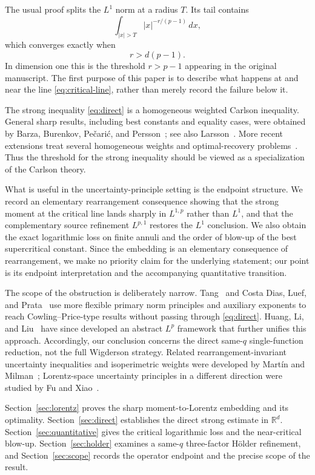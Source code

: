 \documentclass[11pt]{amsart}
\theoremstyle{remark}
\newcommand{\R}{\mathbb R}
\begin{document}
The usual proof splits the $L^1$ norm at a radius $T$.  Its tail contains
\[
 \int_{|x|>T}|x|^{-r/(p-1)}\,dx,
\]
which converges exactly when
\begin{equation}\label{eq:critical-line}
 r>d(p-1).
\end{equation}
In dimension one this is the threshold $r>p-1$ appearing in the original
manuscript.  The first purpose of this paper is to describe what happens at
and near the line \eqref{eq:critical-line}, rather than merely record the
failure below it.

The strong inequality \eqref{eq:direct} is a homogeneous weighted Carlson
inequality.  General sharp results, including best constants and equality
cases, were obtained by Barza, Burenkov, Pe\v{c}ari\'{c}, and
Persson~\cite{BBPP98}; see also Larsson~\cite{Larsson03}.  More recent
extensions treat several homogeneous weights and optimal-recovery
problems~\cite{Osipenko24}.  Thus the threshold for the strong inequality
should be viewed as a specialization of the Carlson theory.

What is useful in the uncertainty-principle setting is the endpoint
structure.  We record an elementary rearrangement consequence showing that
the strong moment at the critical line lands sharply in $L^{1,p}$ rather
than $L^1$, and that the complementary source refinement $L^{p,1}$ restores
the $L^1$ conclusion.  We also obtain the exact logarithmic loss on finite
annuli and the order of blow-up of the best supercritical constant.  Since the embedding is an elementary consequence of rearrangement, we
make no priority claim for the underlying statement; our point is its
endpoint interpretation and the accompanying quantitative transition.

The scope of the obstruction is deliberately narrow.  Tang~\cite{Tang25}
and Costa Dias, Luef, and Prata~\cite{DLP25} use more flexible primary norm
principles and auxiliary exponents to reach Cowling--Price-type results
without passing through \eqref{eq:direct}.  Huang, Li, and Liu~\cite{HLL}
have since developed an abstract $L^p$ framework that further unifies this
approach.  Accordingly, our conclusion concerns the direct same-$q$
single-function reduction, not the full Wigderson strategy.  Related
rearrangement-invariant uncertainty inequalities and isoperimetric weights
were developed by Mart\'in and Milman~\cite{MartinMilman16}; Lorentz-space
uncertainty principles in a different direction were studied by Fu and
Xiao~\cite{FuXiao23}.

Section~\ref{sec:lorentz} proves the sharp moment-to-Lorentz embedding and
its optimality.  Section~\ref{sec:direct} establishes the direct strong
estimate in $\R^d$.  Section~\ref{sec:quantitative} gives the critical
logarithmic loss and the near-critical blow-up.  Section~\ref{sec:holder}
examines a same-$q$ three-factor H\"older refinement, and
Section~\ref{sec:scope} records the operator endpoint and the precise scope
of the result.
\end{document}
